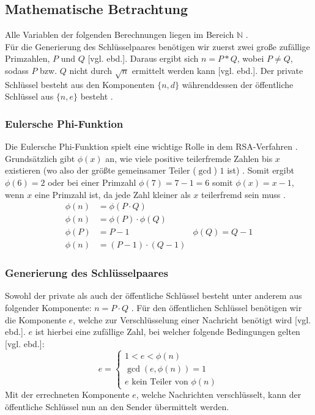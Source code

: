 \documentclass[a4paper,ngerman, headheight=28pt,12pt]{scrartcl}
\newcommand{\vcite}[1]{\cite[vgl.][]{#1}}
\newcommand{\vebd}{[vgl. ebd.]}
\begin{document}
\subsection{Mathematische Betrachtung}
Alle Variablen der folgenden Berechnungen liegen im Bereich $\mathbb{N}$ \vcite{RsaGenCond}. \\
Für die Generierung des Schlüsselpaares benötigen wir zuerst zwei große zufällige Primzahlen, $P$ und $Q$ \vebd. Daraus ergibt sich $n = P * Q$, wobei $P \neq Q$, sodass $P$ bzw. $Q$ nicht durch $\sqrt{n}$ ermittelt werden kann \vebd. Der private Schlüssel besteht aus den Komponenten $\{ n, d \}$ währenddessen der öffentliche Schlüssel aus $\{ n, e \}$ besteht \vcite{RsaVariables}.
\subsubsection{Eulersche Phi-Funktion}
Die Eulersche Phi-Funktion spielt eine wichtige Rolle in dem RSA-Verfahren \vcite{TotientFuncMultiplicative}. Grundsätzlich gibt $\phi(x)$ an, wie viele positive teilerfremde Zahlen bis $x$ existieren (wo also der größte gemeinsamer Teiler ($\gcd$) $1$ ist) \vcite{EulersTotientFunction}. Somit ergibt $\phi(6) = 2$  oder bei einer Primzahl $\phi(7) = 7 - 1 = 6$ somit $\phi(x) = x-1$, wenn $x$ eine Primzahl ist, da jede Zahl kleiner als $x$ teilerfremd sein muss \vcite{TotientFuncMultiplicative}.
\begin{equation*}
  \begin{aligned}
    \phi(n) & = \phi(P \cdot Q)                                                \\
    \phi(n) & = \phi(P) \cdot \phi(Q)                                          \\
    \phi(P) & = P -1                                          & \phi(Q) = Q -1 \\
    \phi(n) & = \left(P - 1 \right) \cdot \left( Q - 1\right)
  \end{aligned}
\end{equation*}
\subsubsection{Generierung des Schlüsselpaares}
Sowohl der private als auch der öffentliche Schlüssel besteht unter anderem aus folgender Komponente: $n = P \cdot Q$ \vcite{RsaMaths1}.
Für den öffentlichen Schlüssel benötigen wir die Komponente $e$, welche zur Verschlüsselung einer Nachricht benötigt wird \vebd. $e$ ist hierbei eine zufällige Zahl, bei welcher folgende Bedingungen gelten \vebd:
\begin{equation*}
  e = \begin{cases}
    1 < e < \phi(n)      \\
    \gcd(e, \phi(n)) = 1 \\
    \text{$e$ kein Teiler von $\phi(n)$}
  \end{cases}
\end{equation*}
Mit der errechneten Komponente $e$, welche Nachrichten verschlüsselt, kann der öffentliche Schlüssel nun an den Sender übermittelt werden.
\end{document}
